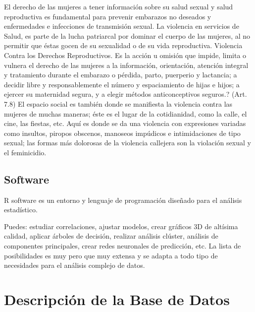 \documentclass[11pt,letter]{article}
\begin{document}
El derecho de las mujeres a tener información sobre su salud sexual y salud reproductiva es fundamental para prevenir embarazos no deseados y enfermedades e infecciones de transmisión sexual. La violencia en servicios
de Salud, es parte de la lucha patriarcal por dominar el cuerpo de las mujeres, al no permitir que éstas gocen de su sexualidad o de su vida reproductiva.
Violencia Contra los Derechos Reproductivos. Es la acción u omisión que impide, limita o vulnera el derecho de las mujeres a la información, orientación, atención integral y tratamiento durante el embarazo o pérdida, parto, puerperio y lactancia; a decidir libre y responsablemente el número y espaciamiento de hijas e hijos; a ejercer su maternidad segura, y a elegir métodos anticonceptivos seguros.? (Art. 7.8)
El espacio social es también donde se manifiesta la violencia contra las mujeres de muchas maneras; éste es el lugar de la cotidianidad, como la calle, el cine, las fiestas, etc. Aquí es donde se da una violencia con expresiones variadas como insultos, piropos obscenos, manoseos impúdicos e intimidaciones de tipo sexual; las formas más dolorosas de la violencia callejera son la violación sexual y el feminicidio.

\subsection{Software}
R software es un entorno y lenguaje de programación diseñado para el análisis estadístico.

Puedes: estudiar correlaciones, ajustar modelos, crear gráficos 3D de altísima calidad, aplicar árboles de decisión, realizar análisis clúster, análisis de componentes principales, crear redes neuronales de predicción, etc.
La lista de posibilidades es muy pero que muy extensa y se adapta a todo tipo de necesidades para el análisis complejo de datos.

\section{Descripción de la Base de Datos}
\end{document}
